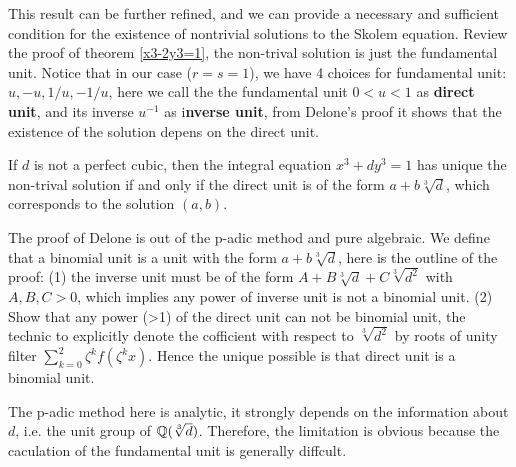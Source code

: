     This result can be further refined, and we can provide a necessary and sufficient condition for the existence of nontrivial solutions to the Skolem equation. Review the proof of theorem \ref{x3-2y3=1}, the non-trival 
    solution is just the fundamental unit. Notice that in our case (\(r=s=1\)), we have 4 choices for fundamental unit: \(u,-u,1/u,-1/u\), here we call the the fundamental unit \(0<u<1\) as \textbf{direct unit}, and its inverse \(u^{-1}\) as i\textbf{nverse unit}, from Delone's proof \cite[Chapter 11]{delone1964theory} it shows that the existence of the solution depens on the direct unit.

    \begin{theorem}[Delone]
        If \(d\) is not a perfect cubic, then the integral equation \(x^3+dy^3=1\) has unique the non-trival solution if and only if the direct unit is of the form \(a+b\sqrt[3]{d}\), which corresponds to the solution \((a,b)\).
    \end{theorem}

    The proof of Delone is out of the p-adic method and pure algebraic. We define that a binomial unit is a unit with the form \(a+b\sqrt[3]{d}\), here is the outline of the proof: (1) the inverse unit must be of the form \(A+B\sqrt[3]{d}+C\sqrt[3]{d^2}\) with \(A,B,C>0\), which implies any power of inverse unit is not a binomial unit. (2) Show that any power (>1) of the direct unit can not be binomial unit, the technic to explicitly denote the cofficient with respect to \(\sqrt[3]{d^2}\) by roots of unity filter \(\sum_{k=0}^{2} \zeta^k f(\zeta^k x)\). Hence the unique possible is that direct unit is a binomial unit.

    The p-adic method here is analytic, it strongly depends on the information about \(d\), i.e. the unit group of \(\mathbb{Q}(\sqrt[3]{d})\). Therefore, the limitation is obvious because the caculation of the fundamental unit is generally diffcult.




